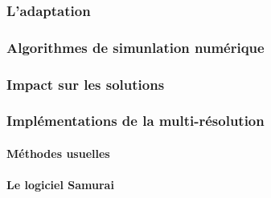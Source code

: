    \paragraph{}
\subsubsection{L'adaptation}
    \paragraph{}
    \paragraph{}
\subsubsection{Algorithmes de simunlation numérique}
    \paragraph{}
    \paragraph{}
\subsubsection{Impact sur les solutions}
    \paragraph{}
    \paragraph{}
\subsubsection{Implémentations de la multi-résolution}
    \paragraph{Méthodes usuelles}
    \paragraph{Le logiciel Samurai}
